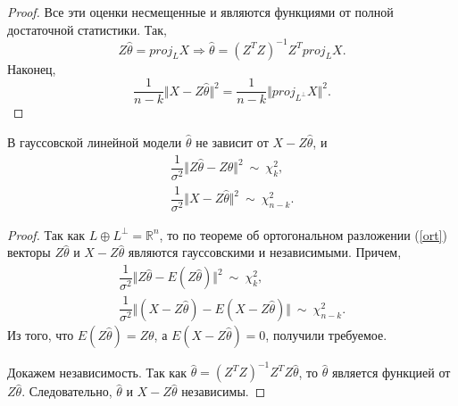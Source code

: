 \begin{proof}
    Все эти оценки несмещенные и являются функциями от полной достаточной статистики. Так,
    \begin{equation*}
        Z\hat{\theta } =proj_{L} X\Rightarrow \hat{\theta } =\left( Z^{T} Z\right)^{-1} Z^{T} proj_{L} X.
    \end{equation*}
    Наконец,
    \begin{equation*}
        \dfrac{1}{n-k}\Vert X-Z\hat{\theta }\Vert ^{2} =\dfrac{1}{n-k}\Vert proj_{L^{\perp }} X\Vert ^{2} .
    \end{equation*}
\end{proof}
\begin{proposition}
    В гауссовской линейной модели $\displaystyle \hat{\theta }$ не зависит от $\displaystyle X-Z\hat{\theta }$, и
    \begin{gather*}
        \dfrac{1}{\sigma ^{2}}\Vert Z\hat{\theta } -Z\theta \Vert ^{2} \ \sim \ \chi _{k}^{2} ,\\
        \dfrac{1}{\sigma ^{2}}\Vert X-Z\hat{\theta }\Vert ^{2} \ \sim \ \chi _{n-k}^{2} .
    \end{gather*}
\end{proposition}
\begin{proof}
    Так как $\displaystyle L\oplus L^{\perp } =\mathbb{R}^{n}$, то по теореме об ортогональном разложении (\ref{ort}) векторы $\displaystyle Z\hat{\theta }$ и $\displaystyle X-Z\hat{\theta }$ являются гауссовскими и независимыми. Причем,
    \begin{gather*}
        \dfrac{1}{\sigma ^{2}}\Vert Z\hat{\theta } -E( Z\hat{\theta })\Vert ^{2} \ \sim \ \chi _{k}^{2} ,\\
        \dfrac{1}{\sigma ^{2}}\Vert ( X-Z\hat{\theta }) -E( X-Z\hat{\theta })\Vert \ \sim \ \chi _{n-k}^{2} .
    \end{gather*}
    Из того, что $\displaystyle E( Z\hat{\theta }) =Z\theta $, а $\displaystyle E( X-Z\hat{\theta }) =0$, получили требуемое.
    
    Докажем независимость. Так как $\displaystyle \hat{\theta } =\left( Z^{T} Z\right)^{-1} Z^{T} Z\hat{\theta }$, то $\displaystyle \hat{\theta }$ является функцией от $\displaystyle Z\hat{\theta }$. Следовательно, $\displaystyle \hat{\theta }$ и $\displaystyle X-Z\hat{\theta }$ независимы.
\end{proof}
